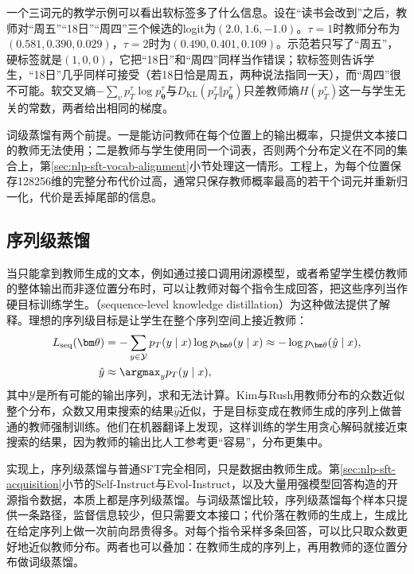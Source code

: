 一个三词元的教学示例可以看出软标签多了什么信息。设在“读书会改到”之后，教师对“周五”“18日”“周四”三个候选的logit为$(2.0,1.6,-1.0)$。$\tau=1$时教师分布为$(0.581,0.390,0.029)$，$\tau=2$时为$(0.490,0.401,0.109)$。示范若只写了“周五”，硬标签就是$(1,0,0)$，它把“18日”和“周四”同样当作错误；软标签则告诉学生，“18日”几乎同样可接受（若18日恰是周五，两种说法指同一天），而“周四”很不可能。软交叉熵$-\sum_vp_T^\tau\log p_{\bm\theta}^\tau$与$D_{\mathrm{KL}}(p_T^\tau\Vert p_{\bm\theta}^\tau)$只差教师熵$H(p_T^\tau)$这一与学生无关的常数，两者给出相同的梯度。

词级蒸馏有两个前提。一是能访问教师在每个位置上的输出概率，只提供文本接口的教师无法使用；二是教师与学生使用同一个词表，否则两个分布定义在不同的集合上，第\ref{sec:nlp-sft-vocab-alignment}小节处理这一情形。工程上，为每个位置保存128256维的完整分布代价过高，通常只保存教师概率最高的若干个词元并重新归一化，代价是丢掉尾部的信息。

\subsection{序列级蒸馏}
\label{sec:nlp-sft-sequence-kd}

当只能拿到教师生成的文本，例如通过接口调用闭源模型，或者希望学生模仿教师的整体输出而非逐位置分布时，可以让教师对每个指令生成回答，把这些序列当作硬目标训练学生。（sequence-level knowledge distillation）为这种做法提供了解释。理想的序列级目标是让学生在整个序列空间上接近教师：
\begin{equation}
 \begin{aligned}
 L_{\mathrm{seq}}(\bm\theta)&=-\sum_{y\in\mathcal Y}p_T(y\mid x)\log p_{\bm\theta}(y\mid x)
 \approx-\log p_{\bm\theta}(\hat y\mid x),\\
 \hat y&\approx\argmax_{y}p_T(y\mid x),
 \end{aligned}
 \label{eq:nlp-sft-seq-kd}
\end{equation}
其中$\mathcal Y$是所有可能的输出序列，求和无法计算。Kim与Rush用教师分布的众数近似整个分布，众数又用束搜索的结果$\hat y$近似，于是目标变成在教师生成的序列上做普通的教师强制训练。他们在机器翻译上发现，这样训练的学生用贪心解码就接近束搜索的结果，因为教师的输出比人工参考更“容易”，分布更集中。

实现上，序列级蒸馏与普通SFT完全相同，只是数据由教师生成。第\ref{sec:nlp-sft-acquisition}小节的Self-Instruct与Evol-Instruct，以及大量用强模型回答构造的开源指令数据，本质上都是序列级蒸馏。与词级蒸馏比较，序列级蒸馏每个样本只提供一条路径，监督信息较少，但只需要文本接口；代价落在教师的生成上，生成比在给定序列上做一次前向昂贵得多。对每个指令采样多条回答，可以比只取众数更好地近似教师分布。两者也可以叠加：在教师生成的序列上，再用教师的逐位置分布做词级蒸馏。

